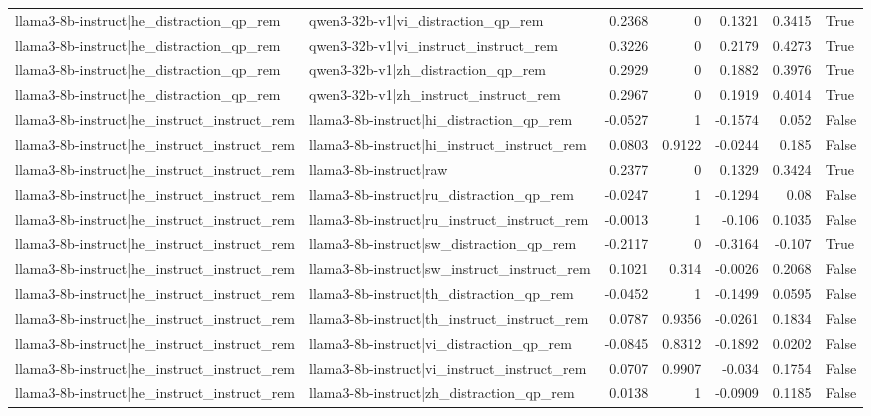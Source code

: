 \begin{table}
\begin{tabular}{l l r r r r l}
llama3-8b-instruct|he_distraction_qp_rem & qwen3-32b-v1|vi_distraction_qp_rem & 0.2368 & 0 & 0.1321 & 0.3415 & True \\
llama3-8b-instruct|he_distraction_qp_rem & qwen3-32b-v1|vi_instruct_instruct_rem & 0.3226 & 0 & 0.2179 & 0.4273 & True \\
llama3-8b-instruct|he_distraction_qp_rem & qwen3-32b-v1|zh_distraction_qp_rem & 0.2929 & 0 & 0.1882 & 0.3976 & True \\
llama3-8b-instruct|he_distraction_qp_rem & qwen3-32b-v1|zh_instruct_instruct_rem & 0.2967 & 0 & 0.1919 & 0.4014 & True \\
llama3-8b-instruct|he_instruct_instruct_rem & llama3-8b-instruct|hi_distraction_qp_rem & -0.0527 & 1 & -0.1574 & 0.052 & False \\
llama3-8b-instruct|he_instruct_instruct_rem & llama3-8b-instruct|hi_instruct_instruct_rem & 0.0803 & 0.9122 & -0.0244 & 0.185 & False \\
llama3-8b-instruct|he_instruct_instruct_rem & llama3-8b-instruct|raw & 0.2377 & 0 & 0.1329 & 0.3424 & True \\
llama3-8b-instruct|he_instruct_instruct_rem & llama3-8b-instruct|ru_distraction_qp_rem & -0.0247 & 1 & -0.1294 & 0.08 & False \\
llama3-8b-instruct|he_instruct_instruct_rem & llama3-8b-instruct|ru_instruct_instruct_rem & -0.0013 & 1 & -0.106 & 0.1035 & False \\
llama3-8b-instruct|he_instruct_instruct_rem & llama3-8b-instruct|sw_distraction_qp_rem & -0.2117 & 0 & -0.3164 & -0.107 & True \\
llama3-8b-instruct|he_instruct_instruct_rem & llama3-8b-instruct|sw_instruct_instruct_rem & 0.1021 & 0.314 & -0.0026 & 0.2068 & False \\
llama3-8b-instruct|he_instruct_instruct_rem & llama3-8b-instruct|th_distraction_qp_rem & -0.0452 & 1 & -0.1499 & 0.0595 & False \\
llama3-8b-instruct|he_instruct_instruct_rem & llama3-8b-instruct|th_instruct_instruct_rem & 0.0787 & 0.9356 & -0.0261 & 0.1834 & False \\
llama3-8b-instruct|he_instruct_instruct_rem & llama3-8b-instruct|vi_distraction_qp_rem & -0.0845 & 0.8312 & -0.1892 & 0.0202 & False \\
llama3-8b-instruct|he_instruct_instruct_rem & llama3-8b-instruct|vi_instruct_instruct_rem & 0.0707 & 0.9907 & -0.034 & 0.1754 & False \\
llama3-8b-instruct|he_instruct_instruct_rem & llama3-8b-instruct|zh_distraction_qp_rem & 0.0138 & 1 & -0.0909 & 0.1185 & False \\

\end{tabular}
\end{table}
